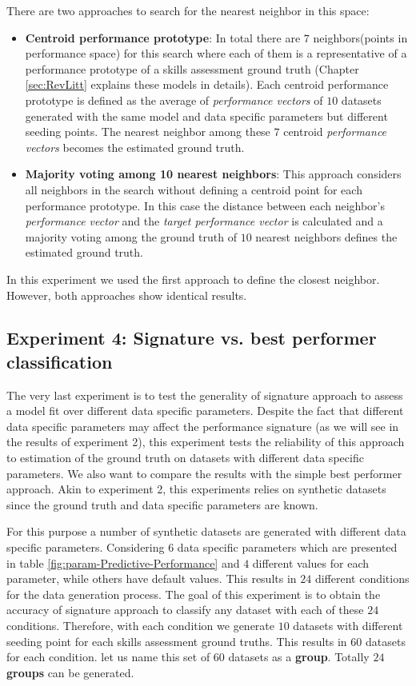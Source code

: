 There are two approaches to search for the nearest neighbor in this space:
\begin{itemize}
\item \textbf{Centroid performance prototype}: In total there are $7$ neighbors(points in performance space) for this search where each of them is a representative of a performance prototype of a skills assessment ground truth (Chapter \ref{sec:RevLitt} explains these models in details). Each centroid performance prototype is defined as the average of \textit{performance vectors} of $10$ datasets generated with the same model and data specific parameters but different seeding points. The nearest neighbor among these $7$ centroid \textit{performance vectors} becomes the estimated ground truth.
\item \textbf{Majority voting among 10 nearest neighbors}: This approach considers all neighbors in the search without defining a centroid point for each performance prototype. In this case the distance between each neighbor's \textit{performance vector} and the \textit{target performance vector} is calculated and a majority voting among the ground truth of $10$ nearest neighbors defines the estimated ground truth.
\end{itemize}

In this experiment we used the first approach to define the closest neighbor. However, both approaches show identical results.

\subsection{Experiment 4:  Signature vs. best performer classification}
\label{Classification}

The very last experiment is to test the generality of signature approach to assess a model fit over different data specific parameters. Despite the fact that different data specific parameters may affect the performance signature (as we will see in the results of experiment 2), this experiment tests the reliability of this approach to estimation of the ground truth on datasets with different data specific parameters. We also want to compare the results with the simple best performer approach. Akin to experiment 2, this experiments relies on synthetic datasets since the ground truth and data specific parameters are known. 

For this purpose a number of synthetic datasets are generated with different data specific parameters. Considering $6$ data specific parameters which are presented in table \ref{fig:param-Predictive-Performance} and $4$ different values for each parameter, while others have default values. This results in $24$ different conditions for the data generation process. The goal of this experiment is to obtain the accuracy of signature approach to classify any dataset with each of these $24$ conditions. Therefore, with each condition we generate $10$ datasets with different seeding point for each skills assessment ground truths. This results in $60$ datasets for each condition. let us name this set of $60$ datasets as a \textbf{group}. Totally $24$ \textbf{groups} can be generated.

